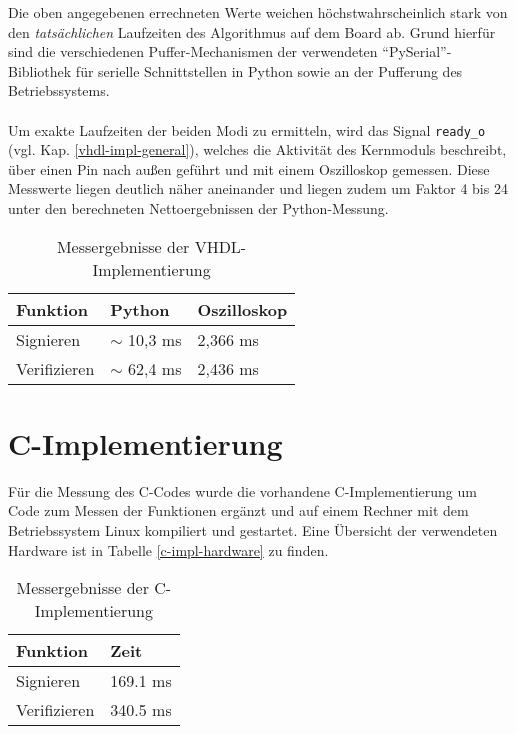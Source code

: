 Die oben angegebenen errechneten Werte weichen höchstwahrscheinlich stark von den \textit{tatsächlichen} Laufzeiten des Algorithmus auf dem Board ab. Grund hierfür sind die verschiedenen Puffer-Mechanismen der verwendeten ``PySerial''-Bibliothek für serielle Schnittstellen in Python sowie an der Pufferung des Betriebssystems. 
\\ \\
Um exakte Laufzeiten der beiden Modi zu ermitteln, wird das Signal \texttt{ready\_o} (vgl. Kap. \ref{vhdl-impl-general}), welches die Aktivität des Kernmoduls beschreibt, über einen Pin nach außen geführt und mit einem Oszilloskop gemessen. Diese Messwerte liegen deutlich näher aneinander und liegen zudem um Faktor 4 bis 24 unter den berechneten Nettoergebnissen der Python-Messung. \\

\begin{table}[h]
	\centering 
	\begin{tabular}{ | p{3cm} | p{3cm} | p{3cm} | }
		\hline
		\textbf{Funktion} & \textbf{Python} & \textbf{Oszilloskop} \\
		\hline
		Signieren & $\sim$ 10,3 ms & 2,366 ms\\
		\hline
		Verifizieren & $\sim$ 62,4 ms & 2,436 ms\\
		\hline
	\end{tabular}
	\caption{Messergebnisse der VHDL-Implementierung}
	\label{vhdl-messung-2}
\end{table}

\section{C-Implementierung}
Für die Messung des C-Codes wurde die vorhandene C-Implementierung um Code zum Messen der Funktionen ergänzt und auf einem Rechner mit dem Betriebssystem Linux kompiliert und gestartet. Eine Übersicht der verwendeten Hardware ist in Tabelle \ref{c-impl-hardware} zu finden. \\

\begin{table}[h]
	\centering 
	\begin{tabular}{ | p{3cm} | p{6cm} | }
		\hline
		\textbf{Funktion} & \textbf{Zeit} \\
		\hline
		Signieren & 169.1 ms \\
		\hline
		Verifizieren & 340.5 ms \\
		\hline
	\end{tabular}
	\caption{Messergebnisse der C-Implementierung}
	\label{c-messung}
\end{table}

